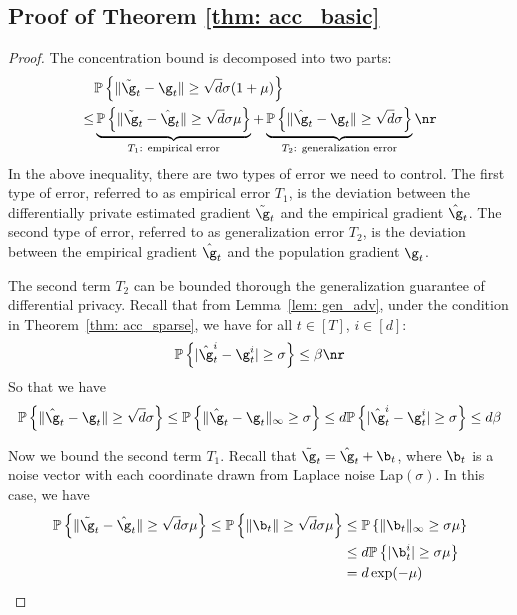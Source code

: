 \subsection{Proof of Theorem \ref{thm: acc_basic}}

\theoaccbasic*

\begin{proof}
The concentration bound is decomposed into two parts:
\begin{equation}
    \begin{split}
    &\mathbb{P} 
    \left\{ \|\tilde \g_t - \g_t\| \geq \sqrt{d}\sigma(1+\mu)\right\} \\
    \leq&   
    \underbrace{ \mathbb{P}\left\{ \|\tilde \g_t - \hat \g_t\| \geq  \sqrt{d}\sigma \mu\right\} }_{\text{$T_1$: empirical error}} 
     + \underbrace{\mathbb{P}\left\{ \|\hat \g_t - \g_t\| \geq \sqrt{d}\sigma \right\}}_{\text{$T_2$: generalization error}} \nr
    \end{split}
\end{equation}
In the above inequality, there are two types of error we need to control. The first type of error, referred to as empirical error $T_1$, is the deviation between the differentially
private estimated gradient $\tilde \g_t$ and the empirical gradient $\hat \g_t$. The second type of error, referred to as generalization error $T_2$, is the deviation
between the empirical gradient $\hat \g_t$ and the population gradient $\g_t$. 

The second term $T_2$ can be bounded thorough the generalization guarantee of differential privacy. Recall that from  Lemma~\ref{lem: gen_adv}, under the condition in Theorem~\ref{thm: acc_sparse}, we have for all $t \in [T]$, $i \in [d]$: 
\begin{equation}
    \mathbb{P}\left\{ |\hat \g_t^i - \g_t^i| \geq  \sigma \right\} \leq \beta \nr
\end{equation}
So that we have 
\begin{equation}\label{eq: gen1}
\mathbb{P}\left\{ \|\hat \g_t - \g_t\| \geq  \sqrt{d}\sigma \right\} \leq \mathbb{P}\left\{ \|\hat \g_t - \g_t\|_\infty \geq  \sigma  \right\} \leq d \mathbb{P}\left\{ |\hat \g_t^i - \g_t^i| \geq  \sigma \right\} \leq d\beta 
\end{equation}

Now we bound the second term $T_1$. Recall that $\tilde \g_t = \hat \g_t + \b_t$, where $\b_t$ is a noise vector with each coordinate drawn from Laplace noise Lap$(\sigma)$. In this case, we have
\begin{align} \label{eq: acc1}
\mathbb{P}\left\{ \|\tilde \g_t - \hat \g_t\| \geq  \sqrt{d}\sigma \mu \right\}  \leq \mathbb{P} \left\{ \|\b_t\| \geq  \sqrt{d}\sigma \mu \right\}  &\leq \mathbb{P} \left\{ \|\b_t\|_\infty \geq  \sigma \mu \right\} \\ 
  &\leq d \mathbb{P} \left\{ |\b_t^i| \geq \sigma \mu \right\}\\
    &= d \exp(-\mu)
\end{align}


\end{proof}
